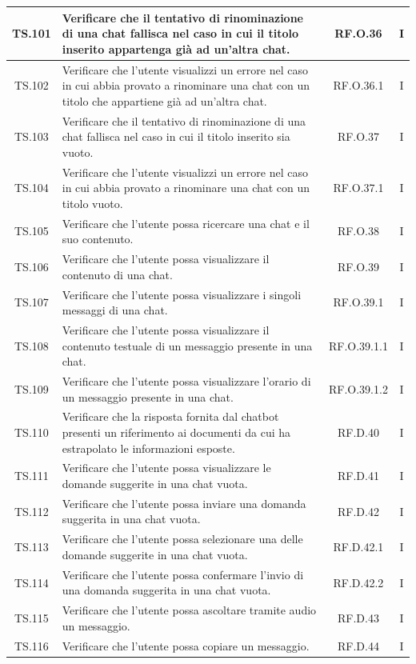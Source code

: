 \begin{xltabular}{\textwidth}{|c|X|c|c|}
\hline
TS.101 & Verificare che il tentativo di rinominazione di una chat fallisca nel caso in cui il titolo inserito appartenga già ad un’altra chat. & RF.O.36 & I \\
\hline
TS.102 & Verificare che l'utente visualizzi un errore nel caso in cui abbia provato a rinominare una chat con un titolo che appartiene già ad un’altra chat. & RF.O.36.1 & I \\
\hline
TS.103 & Verificare che il tentativo di rinominazione di una chat fallisca nel caso in cui il titolo inserito sia vuoto. & RF.O.37 & I \\
\hline
TS.104 & Verificare che l'utente visualizzi un errore nel caso in cui abbia provato a rinominare una chat con un titolo vuoto. & RF.O.37.1 & I \\
\hline
TS.105 & Verificare che l'utente possa ricercare una chat e il suo contenuto. & RF.O.38 & I \\
\hline
TS.106 & Verificare che l'utente possa visualizzare il contenuto di una chat. & RF.O.39 & I \\
\hline
TS.107 & Verificare che l'utente possa visualizzare i singoli messaggi di una chat. & RF.O.39.1 & I \\
\hline
TS.108 & Verificare che l'utente possa visualizzare il contenuto testuale di un messaggio presente in una chat. & RF.O.39.1.1 & I \\
\hline
TS.109 & Verificare che l'utente possa visualizzare l’orario di un messaggio presente in una chat. & RF.O.39.1.2 & I \\
\hline
TS.110 & Verificare che la risposta fornita dal chatbot presenti un riferimento ai documenti da cui ha estrapolato le informazioni esposte. & RF.D.40 & I \\
\hline
TS.111 & Verificare che l'utente possa visualizzare le domande suggerite in una chat vuota. & RF.D.41 & I \\
\hline
TS.112 & Verificare che l'utente possa inviare una domanda suggerita in una chat vuota. & RF.D.42 & I \\
\hline
TS.113 & Verificare che l'utente possa selezionare una delle domande suggerite in una chat vuota. & RF.D.42.1 & I \\
\hline
TS.114 & Verificare che l'utente possa confermare l’invio di una domanda suggerita in una chat vuota. & RF.D.42.2 & I \\
\hline
TS.115 & Verificare che l'utente possa ascoltare tramite audio un messaggio. & RF.D.43 & I \\
\hline
TS.116 & Verificare che l'utente possa copiare un messaggio. & RF.D.44 & I \\

\end{xltabular}
